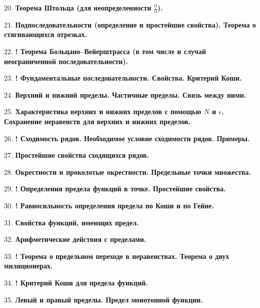 \documentclass[12pt]{article}
\begin{document}
20. \textbf{Теорема Штольца (для неопределенности $\frac{0}{0}$).}

21. \textbf{Подпоследовательности (определение и простейшие свойства). Теорема о стягивающихся отрезках. }

22. \textbf{! Теорема Больцано–Вейерштрасса (в том числе и случай неограниченной последовательности).}

23. \textbf{! Фундаментальные последовательности. Свойства. Критерий Коши.}

24. \textbf{Верхний и нижний пределы. Частичные пределы. Связь между ними.}

25. \textbf{Характеристика верхних и нижних пределов с помощью $N$ и $\epsilon$. Сохранение неравенств для верхних и нижних пределов.}

26. \textbf{! Сходимость рядов. Необходимое условие сходимости рядов. Примеры.}

27. \textbf{Простейшие свойства сходящихся рядов.}

28. \textbf{Окрестности и проколотые окрестности. Предельные точки множества.}

29. \textbf{! Определения предела функций в точке. Простейшие свойства.}

30. \textbf{! Равносильность определения предела по Коши и по Гейне.}

31. \textbf{Свойства функций, имеющих предел.}

32. \textbf{Арифметические действия с пределами.}

33. \textbf{! Теорема о предельном переходе в неравенствах. Теорема о двух милиционерах.}

34. \textbf{! Критерий Коши для предела функций.}

35. \textbf{Левый и правый пределы. Предел монотонной функции.}
\end{document}
